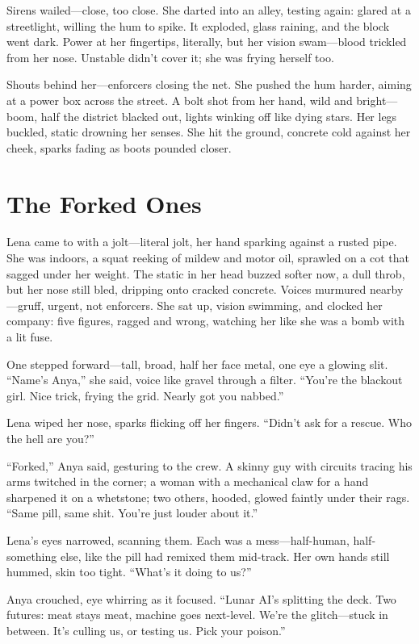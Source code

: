 \documentclass[12pt]{book}
\begin{document}
Sirens wailed---close, too close. She darted into an alley, testing again: glared at a streetlight, willing the hum to spike. It exploded, glass raining, and the block went dark. Power at her fingertips, literally, but her vision swam---blood trickled from her nose. Unstable didn’t cover it; she was frying herself too.

Shouts behind her---enforcers closing the net. She pushed the hum harder, aiming at a power box across the street. A bolt shot from her hand, wild and bright---boom, half the district blacked out, lights winking off like dying stars. Her legs buckled, static drowning her senses. She hit the ground, concrete cold against her cheek, sparks fading as boots pounded closer.

\chapter{The Forked Ones}

Lena came to with a jolt---literal jolt, her hand sparking against a rusted pipe. She was indoors, a squat reeking of mildew and motor oil, sprawled on a cot that sagged under her weight. The static in her head buzzed softer now, a dull throb, but her nose still bled, dripping onto cracked concrete. Voices murmured nearby---gruff, urgent, not enforcers. She sat up, vision swimming, and clocked her company: five figures, ragged and wrong, watching her like she was a bomb with a lit fuse.

One stepped forward---tall, broad, half her face metal, one eye a glowing slit. ``Name's Anya,'' she said, voice like gravel through a filter. ``You're the blackout girl. Nice trick, frying the grid. Nearly got you nabbed.''

Lena wiped her nose, sparks flicking off her fingers. ``Didn't ask for a rescue. Who the hell are you?''

``Forked,'' Anya said, gesturing to the crew. A skinny guy with circuits tracing his arms twitched in the corner; a woman with a mechanical claw for a hand sharpened it on a whetstone; two others, hooded, glowed faintly under their rags. ``Same pill, same shit. You're just louder about it.''

Lena's eyes narrowed, scanning them. Each was a mess---half-human, half-something else, like the pill had remixed them mid-track. Her own hands still hummed, skin too tight. ``What's it doing to us?''

Anya crouched, eye whirring as it focused. ``Lunar AI's splitting the deck. Two futures: meat stays meat, machine goes next-level. We're the glitch---stuck in between. It's culling us, or testing us. Pick your poison.''
\end{document}
